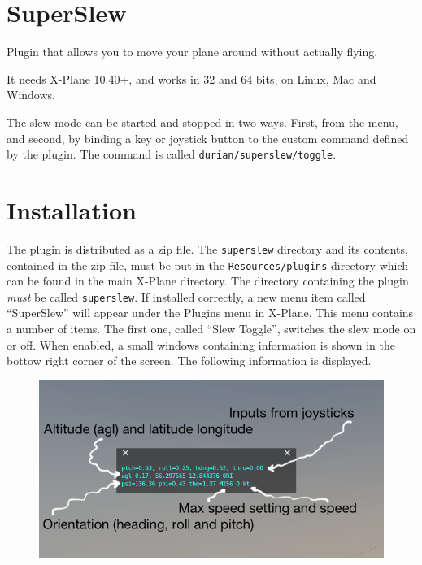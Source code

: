 \documentclass[a4paper,12pt]{article}
\begin{document}
\section*{\Huge{\textbf{SuperSlew}}}
\vspace{1cm}

Plugin that allows you to move your plane around without actually flying.

\vspace{0.5\baselineskip}
It needs X-Plane 10.40+, and works in 32 and 64 bits, on Linux, Mac
and Windows.

\vspace{0.5\baselineskip}
The slew mode can be started and stopped in two ways. First, from the
menu, and second, by binding a key or joystick button to the custom command
defined by the plugin. The command is called
\texttt{durian/superslew/toggle}. 

\vspace{1cm}
\section*{\Huge{\textbf{Installation}}}
\vspace{1cm}

The plugin is distributed as a zip file. The \texttt{superslew}
directory and its contents, contained in the zip file, must be put in
the \texttt{Resources/plugins} directory which can be found in the
main X-Plane directory. The directory containing the plugin
\textsl{must} be called \texttt{superslew}. If installed correctly, a
new menu item called ``SuperSlew'' will appear under the Plugins menu
in X-Plane. This menu contains a number of items. The first one,
called ``Slew Toggle'', switches the slew mode on or off. When
enabled, a small windows containing information is shown in the bottow
right corner of the screen. The following information is displayed.

\begin{figure}[h!]%
\centering
\includegraphics[width=1.0\textwidth]{infowindow.png}
\label{fig:infowindow}
\end{figure}
\end{document}
